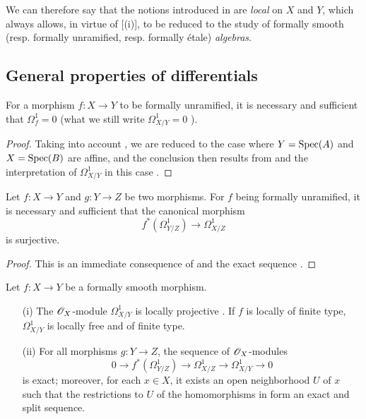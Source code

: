 We can therefore say that the notions introduced in  are \emph{local} on $X$ and $Y$, which always allows, in virtue of [(i)], to be reduced to the study of formally smooth (resp. formally unramified, resp. formally \'etale) \emph{algebras}.

\subsection{General properties of differentials}
\label{subsection:IV.17.2}

\begin{proposition}[17.2.1]
\label{IV.17.2.1}
For a morphism $f : X \to Y$ to be formally unramified, it is necessary and sufficient that $\Omega^1 _f = 0$ (what we still write $\Omega^1 _{X/Y} = 0$ ).	
\end{proposition}

\begin{proof}
Taking into account , we are reduced to the case where $Y = {\mathop{\mathrm{Spec}}\nolimits}(A)$ and $X = {\mathop{\mathrm{Spec}}\nolimits}(B)$ are affine, and the conclusion then results from  and the interpretation of $\Omega^1 _{X/Y}$ in this case .
\end{proof}

\begin{corollary}[17.2.2]
\label{IV.17.2.2}
Let $f: X \to Y$ and $g: Y \to Z$ be two morphisms. 
For $f$ being formally unramified, it is necessary and sufficient that the canonical morphism 
\[
  f^*(\Omega^1_{Y/Z}) \to \Omega^1_{X/Z}
\] is surjective.
\end{corollary}

\begin{proof}
This is an immediate consequence of  and the exact sequence .
\end{proof}

\begin{proposition}[17.2.3]
\label{IV.17.2.3}
Let $f: X \to Y$ be a formally smooth morphism.
\begin{enumerate}
\item[(i)] The $\mathscr{O}_X$-module $\Omega^1 _{X/Y}$ is locally projective . If $f$ is locally of finite type, $\Omega^1 _{X/Y}$ is locally free and of finite type.
\item[(ii)] For all morphisms $g : Y \to Z$, the sequence  of $\mathscr{O}_X$-modules
\[
\label{IV.17.2.3.1}
 0 \to f^*(\Omega^1 _{Y/Z}) \to \Omega^1 _{X/Z} \to \Omega^1 _{X/Y} \to 0
\tag{17.2.3.1}
\] is exact; moreover, for each $x \in X$, it exists an open neighborhood $U$ of $x$ such that the restrictions to $U$ of the homomorphisms in  form an exact and split sequence.
\end{enumerate}
\end{proposition}

